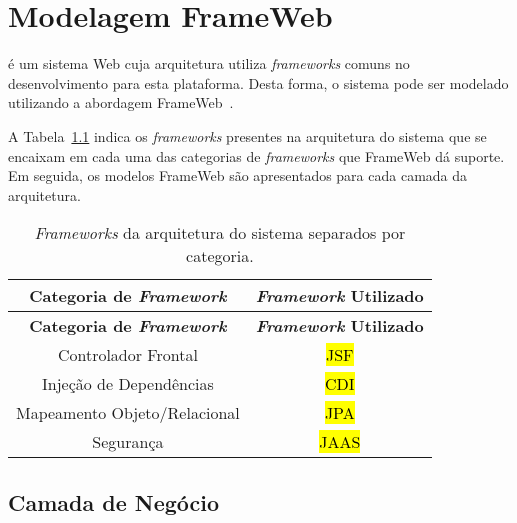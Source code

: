
\chapter{Modelagem FrameWeb}
\label{sec-frameweb}
\vspace{-1cm}

\emph{\imprimirtitulo} é um sistema Web cuja arquitetura utiliza \textit{frameworks} comuns no desenvolvimento para esta plataforma. Desta forma, o sistema pode ser modelado utilizando a abordagem FrameWeb~\cite{souza-celebratingfalbo20}.

A Tabela~\ref{tabela-frameworks} indica os \textit{frameworks} presentes na arquitetura do sistema que se encaixam em cada uma das categorias de \textit{frameworks} que FrameWeb dá suporte. Em seguida, os modelos FrameWeb são apresentados para cada camada da arquitetura.



\begin{footnotesize}
	\begin{longtable}{|c|c|}
		\caption{\textit{Frameworks} da arquitetura do sistema separados por categoria.}
		\label{tabela-frameworks}\\\hline
		
		\rowcolor{lightgray}
		\textbf{Categoria de \textit{Framework}} & \textbf{\textit{Framework} Utilizado} \\\hline 
		\endfirsthead
		\hline
		\rowcolor{lightgray}
		\textbf{Categoria de \textit{Framework}} & \textbf{\textit{Framework} Utilizado} \\\hline 
		\endhead

		Controlador Frontal & \hl{JSF} \\\hline

		Injeção de Dependências & \hl{CDI} \\\hline

		Mapeamento Objeto/Relacional & \hl{JPA} \\\hline

		Segurança & \hl{JAAS} \\\hline
	\end{longtable}
\end{footnotesize}




\section{Camada de Negócio}
\label{sec-frameweb-negocio}

